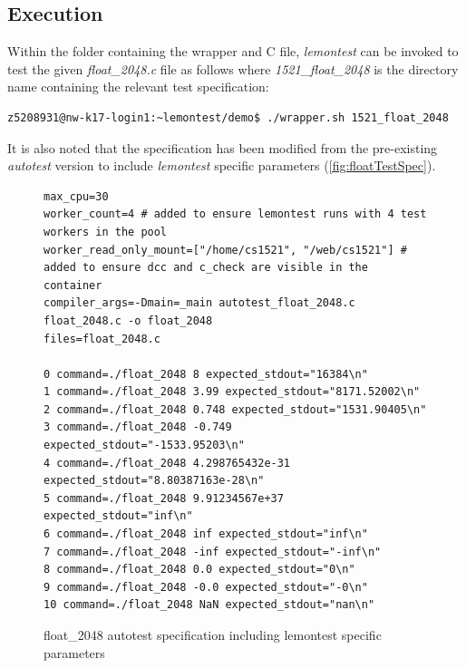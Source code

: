 \documentclass[hidelinks]{report}
\begin{document}
\subsection{Execution}
Within the folder containing the wrapper and C file, \textit{lemontest} can be invoked to test the given \textit{float\_2048.c} file as follows where \textit{1521\_float\_2048} is the directory name containing the relevant test specification:
\begin{lstlisting}[breaklines=true, linewidth=\linewidth, tabsize=4]
z5208931@nw-k17-login1:~lemontest/demo$ ./wrapper.sh 1521_float_2048
\end{lstlisting}
It is also noted that the specification has been modified from the pre-existing \textit{autotest} version to include \textit{lemontest} specific parameters (\autoref{fig:floatTestSpec}).
\begin{figure}[h]
	\centering
	\begin{lstlisting}[breaklines=true, linewidth=\linewidth, tabsize=4]
max_cpu=30
worker_count=4 # added to ensure lemontest runs with 4 test workers in the pool
worker_read_only_mount=["/home/cs1521", "/web/cs1521"] # added to ensure dcc and c_check are visible in the container
compiler_args=-Dmain=_main autotest_float_2048.c float_2048.c -o float_2048
files=float_2048.c

0 command=./float_2048 8 expected_stdout="16384\n"
1 command=./float_2048 3.99 expected_stdout="8171.52002\n"
2 command=./float_2048 0.748 expected_stdout="1531.90405\n"
3 command=./float_2048 -0.749 expected_stdout="-1533.95203\n"
4 command=./float_2048 4.298765432e-31 expected_stdout="8.80387163e-28\n"
5 command=./float_2048 9.91234567e+37 expected_stdout="inf\n"
6 command=./float_2048 inf expected_stdout="inf\n"
7 command=./float_2048 -inf expected_stdout="-inf\n"
8 command=./float_2048 0.0 expected_stdout="0\n"
9 command=./float_2048 -0.0 expected_stdout="-0\n"
10 command=./float_2048 NaN expected_stdout="nan\n"
	\end{lstlisting}
	\caption{float\_2048 autotest specification including lemontest specific parameters}
	\label{fig:floatTestSpec}
\end{figure}
\end{document}
